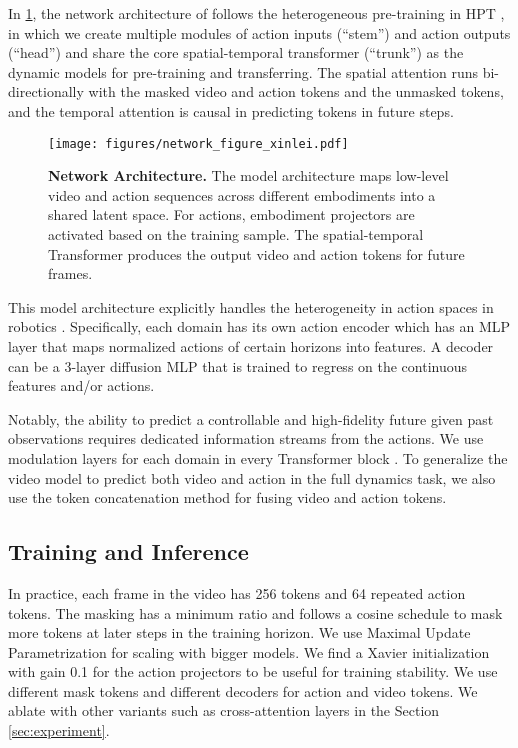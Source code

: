 In \cref{fig:network}, the network architecture of \ourshort follows the heterogeneous pre-training in HPT \cite{wang2024scaling}, in which we create multiple modules of action inputs (``stem'') and action outputs (``head'') and share the core spatial-temporal transformer (``trunk'') as the dynamic models for pre-training and transferring. The spatial attention runs bi-directionally with the masked video and action tokens and the unmasked tokens, and the temporal attention is causal in predicting tokens in future steps.

\begin{figure}
    \centering
    \texttt{[image: figures/network\_figure\_xinlei.pdf]}
    \caption{\textbf{Network Architecture.} The \ourshort model architecture maps low-level video and action sequences across different embodiments into a shared latent space. For actions, embodiment projectors are activated based on the training sample. The spatial-temporal Transformer produces the output video and action tokens for future frames.   }
    \label{fig:network}
\end{figure}

This model architecture explicitly handles the heterogeneity in action spaces in robotics \cite{wang2024scaling,shazeer2017outrageously}. Specifically, each domain has its own action encoder which has an MLP layer that maps normalized actions of certain horizons into features. A decoder can be a 3-layer diffusion MLP that is trained to regress on the continuous features and/or actions.

Notably, the ability to predict a controllable and high-fidelity future given past observations requires dedicated information streams from the actions. We use modulation \cite{peebles2023scalable} layers for each domain in every Transformer block \cite{shazeer2017outrageously}. To generalize the video model to predict both video and action in the full dynamics task, we also use the token concatenation method for fusing video and action tokens.

\subsection{Training and Inference}

In practice, each frame in the video has 256 tokens and 64 repeated action tokens. The masking has a minimum ratio and follows a cosine schedule to mask more tokens at later steps in the training horizon. We  use Maximal Update Parametrization \cite{yang2022tensor} for scaling with bigger models.  We find a Xavier initialization with gain 0.1 for the action projectors to be useful for training stability.  We use different mask tokens and different decoders for action and video tokens. We ablate with other variants such as cross-attention layers in the Section \ref{sec:experiment}.


